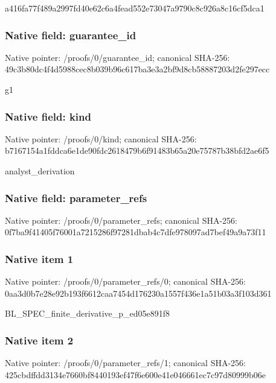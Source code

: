 \documentclass[10pt,a4paper]{article}
\begin{document}
\begingroup\raggedright\sloppy a416fa77f489a2997fd40e62c6a4fead552e73047a9790c8c926a8c16cf5dca1\par\endgroup

\subsubsection{Native field: guarantee\_\allowbreak{}id}
Native pointer: /proofs/0/guarantee\_\allowbreak{}id; canonical SHA-256: 49c3b80dc4f4d5988cec8b039b96c617ba3e3a2bf9d8cb58887203d2fe297ecc

\begingroup\raggedright\sloppy g1\par\endgroup

\subsubsection{Native field: kind}
Native pointer: /proofs/0/kind; canonical SHA-256: b7167154a1fddca6e1de90fdc2618479b6f91483b65a20e75787b38bfd2ae6f5

\begingroup\raggedright\sloppy analyst\_\allowbreak{}derivation\par\endgroup

\subsubsection{Native field: parameter\_\allowbreak{}refs}
Native pointer: /proofs/0/parameter\_\allowbreak{}refs; canonical SHA-256: 0f7ba9f41405f76001a7215286f97281dbab4c7dfe978097ad7bef49a9a73f11

\subsubsection{Native item 1}
Native pointer: /proofs/0/parameter\_\allowbreak{}refs/0; canonical SHA-256: 0aa3d0b7e28e92b193f6612caa7454d176230a1557f436e1a51b03a3f103d361

\begingroup\raggedright\sloppy BL\_\allowbreak{}SPEC\_\allowbreak{}finite\_\allowbreak{}derivative\_\allowbreak{}p\_\allowbreak{}ed05e891f8\par\endgroup

\subsubsection{Native item 2}
Native pointer: /proofs/0/parameter\_\allowbreak{}refs/1; canonical SHA-256: 425cbdffdd3134e7660bf8440193ef47f6e600e41e046661ec7c97d80999b06e
\end{document}
